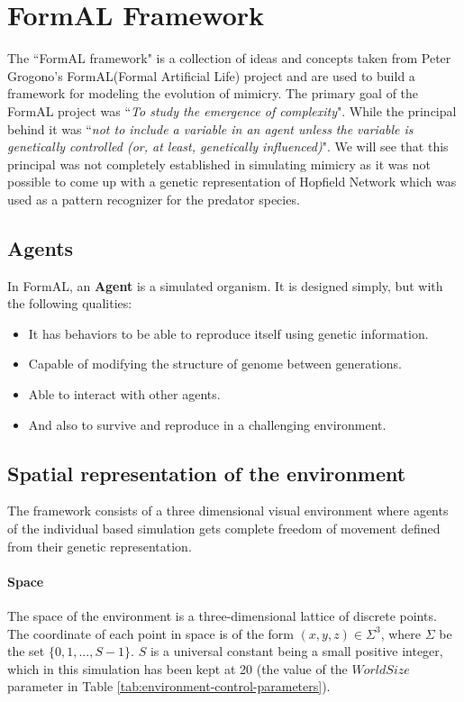 \section{FormAL Framework}
The ``FormAL framework" is a collection of ideas and concepts taken from Peter Grogono's FormAL(Formal Artificial Life) project \cite{grogono2003} and are used to build a framework for modeling the evolution of mimicry. The primary goal of the FormAL project was ``\textit{To study the emergence of complexity}". While the principal behind it was ``\textit{not to include a variable in an agent unless the variable is genetically controlled (or, at least, genetically influenced)}". We will see that this principal was not completely established in simulating mimicry as it was not possible to come up with a genetic representation of Hopfield Network which was used as a pattern recognizer for the predator species. 

\subsection{Agents}
In FormAL, an \textbf{Agent} is a simulated organism. It is designed simply, but with the following qualities:

\begin{itemize}
	\item It has behaviors to be able to reproduce itself using genetic information.
	\item Capable of modifying the structure of genome between generations.
	\item Able to interact with other agents.
	\item And also to survive and reproduce in a challenging environment.
\end{itemize}

\subsection{Spatial representation of the environment}
The framework consists of a three dimensional visual environment where agents of the individual based simulation gets complete freedom of movement defined from their genetic representation. 

\paragraph{Space}
The space of the environment is a three-dimensional lattice of discrete points. The coordinate of each point in space is of the form \((x,y,z) \in \Sigma^3\), where \(\Sigma\) be the set \(\{0, 1, ..., S-1\}\). \(S\) is a universal constant being a small positive integer, which in this simulation has been kept at 20 (the value of the \(World Size\) parameter in Table \ref{tab:environment-control-parameters}). 

